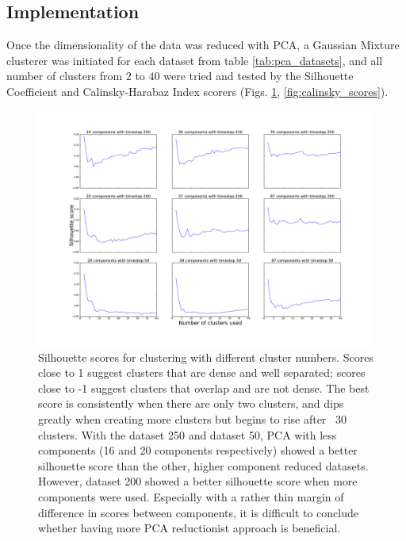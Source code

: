 \documentclass[journal,12pt,onecolumn,draftclsnofoot]{IEEEtran}  %
\begin{document}


\subsection{Implementation}
Once the dimensionality of the data was reduced with PCA, a Gaussian Mixture clusterer was initiated for each dataset from table \ref{tab:pca_datasets}, and all number of clusters from $2$ to $40$ were tried and tested by the Silhouette Coefficient and Calinsky-Harabaz Index scorers (Figs. \ref{fig:silhouette_scores}, \ref{fig:calinsky_scores}).


\begin{figure}[H]
  \centering
  \includegraphics[width=\linewidth]{figures/silhouette_scores.pdf}
  \caption{Silhouette scores for clustering with different cluster numbers. Scores close to 1 suggest clusters that are dense and well separated; scores close to -1 suggest clusters that overlap and are not dense. The best score is consistently when there are only two clusters, and dips greatly when creating more clusters but begins to rise after ~30 clusters. With the dataset 250 and dataset 50, PCA with less components (16 and 20 components respectively) showed a better silhouette score than the other, higher component reduced datasets. However, dataset 200 showed a better silhouette score when more components were used. Especially with a rather thin margin of difference in scores between components, it is difficult to conclude whether having more PCA reductionist approach is beneficial.}
  \label{fig:silhouette_scores}
\end{figure}
\end{document}
